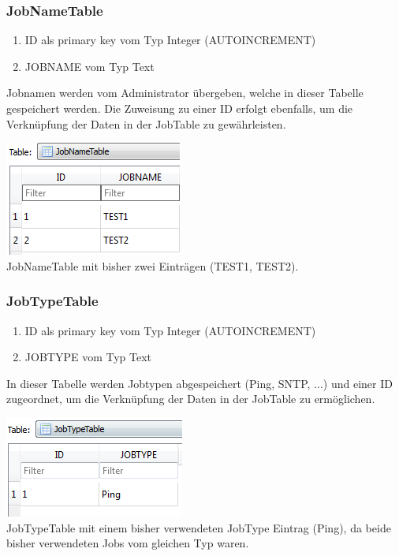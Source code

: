 \documentclass[12pt,a4paper]{report}
\begin{document}
\begin{onehalfspace}
\subsubsection{JobNameTable}
\begin{enumerate}
\item ID als primary key vom Typ Integer (AUTOINCREMENT)
\item JOBNAME vom Typ Text
\end{enumerate}
Jobnamen werden vom Administrator übergeben, welche in dieser Tabelle gespeichert werden. Die Zuweisung zu einer ID erfolgt ebenfalls, um die Verknüpfung der Daten in der JobTable zu gewährleisten.
\begin{center}
\includegraphics[scale=0.8]{img/db-tb-jobname.png}\\
JobNameTable mit bisher zwei Einträgen (TEST1, TEST2).
\end{center}
\subsubsection{JobTypeTable}
\begin{enumerate}
\item ID als primary key vom Typ Integer (AUTOINCREMENT)
\item JOBTYPE vom Typ Text
\end{enumerate}
In dieser Tabelle werden Jobtypen abgespeichert (Ping, SNTP, ...) und einer ID zugeordnet, um die Verknüpfung der Daten in der JobTable zu ermöglichen.
\begin{center}
\includegraphics[scale=0.8]{img/db-tb-jobtype.png}\\
JobTypeTable mit einem bisher verwendeten JobType Eintrag (Ping), da beide bisher verwendeten Jobs vom gleichen Typ waren.
\end{center}

\end{onehalfspace}
\end{document}

